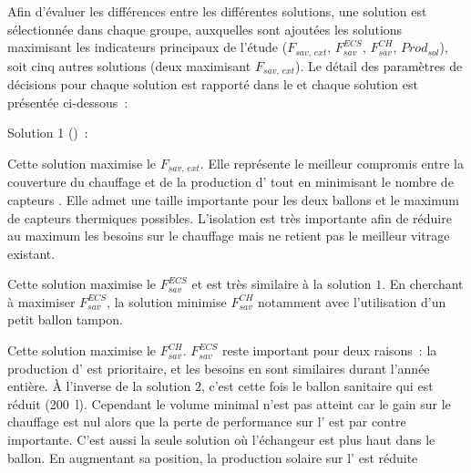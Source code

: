 Afin d’évaluer les différences entre les différentes solutions,
une solution est sélectionnée dans chaque groupe, auxquelles sont ajoutées les solutions maximisant les indicateurs
principaux de l’étude ($F_{sav,\,ext}$, $F_{sav}^{ECS}$, $F_{sav}^{CH}$, $Prod_{sol}$),
soit cinq autres solutions (deux maximisant $F_{sav,\,ext}$).
Le détail des paramètres de décisions pour chaque solution est rapporté dans le 
et chaque solution est présentée ci-dessous~:
\begin{blockdescription}{Solution 1 ()~:}
  \item[Solution 1 (\abr{S1})~:] Cette solution maximise le $F_{sav,\,ext}$. Elle représente
                                 le meilleur compromis entre la couverture du chauffage
                                 et de la production d’ tout en minimisant
                                 le nombre de capteurs . Elle admet une taille
                                 importante pour les deux ballons et le maximum de capteurs
                                 thermiques possibles. L’isolation est très importante
                                 afin de réduire au maximum les besoins sur le chauffage mais
                                 ne retient pas le meilleur vitrage existant.
  \item[Solution 2 (\abr{S2})~:] Cette solution maximise le $F_{sav}^{ECS}$ et est très
                                 similaire à la solution $1$. En cherchant à maximiser $F_{sav}^{ECS}$,
                                 la solution minimise $F_{sav}^{CH}$ notamment avec l’utilisation
                                 d’un petit ballon tampon.
  \item[Solution 3 (\abr{S3})~:] Cette solution maximise le $F_{sav}^{CH}$. $F_{sav}^{ECS}$ reste
                                 important pour deux raisons~: la production d’ est prioritaire,
                                 et les besoins en  sont similaires durant l’année entière.
                                 À l’inverse de la solution $2$, c’est cette fois le ballon sanitaire qui
                                 est réduit (\SI{200}{\litre}). Cependant le volume minimal n’est pas
                                 atteint car le gain sur le chauffage est nul alors que la perte de
                                 performance sur l’ est par contre importante. C’est aussi la seule solution où
                                 l’échangeur est plus haut dans le ballon.
                                 En augmentant sa position, la production solaire sur l’ est réduite

\end{blockdescription}
